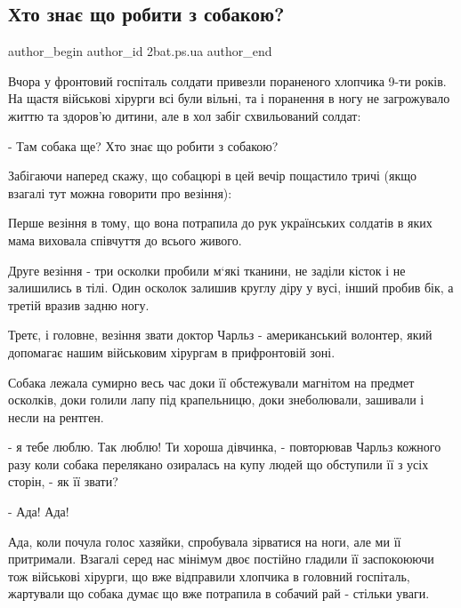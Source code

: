  
 
 
 
 
 
\subsection{Хто знає що робити з собакою?}
\label{sec:04_05_2022.fb.2bat.ps.ua.1.sobaka}
 
\ifcmt
 author_begin
   author_id 2bat.ps.ua
 author_end
\fi

Вчора у фронтовий госпіталь солдати привезли пораненого хлопчика 9-ти років. На
щастя військові хірурги всі були вільні, та і поранення в ногу не загрожувало
життю та здоров’ю дитини, але в хол забіг схвильований солдат:

- Там собака ще? Хто знає що робити з собакою?

Забігаючи наперед скажу, що собацюрі в цей вечір пощастило тричі (якщо взагалі
тут можна говорити про везіння): 

Перше везіння в тому, що вона потрапила до рук українських солдатів  в яких
мама  виховала  співчуття до всього живого. 

Друге везіння - три осколки пробили м‘які тканини, не заділи кісток і не
залишились в тілі. Один осколок залишив круглу діру у вусі, інший пробив бік, а
третій вразив задню ногу. 

Третє, і головне, везіння звати доктор Чарльз - американський волонтер, який
допомагає нашим військовим хірургам в прифронтовій зоні. 

Собака лежала сумирно весь час доки її обстежували магнітом на предмет
осколків, доки голили лапу під крапельницю, доки знеболювали, зашивали і несли
на рентген. 

- я тебе люблю. Так люблю! Ти хороша дівчинка, - повторював Чарльз кожного разу
коли собака перелякано озиралась на купу людей що обступили її з усіх сторін, -
як її звати?

- Ада! Ада!

Ада, коли почула голос хазяйки,  спробувала зірватися на ноги, але ми її
притримали. Взагалі серед нас мінімум двоє постійно гладили її заспокоюючи тож
військові хірурги, що вже відправили хлопчика в головний госпіталь, жартували
що собака думає що вже потрапила в собачий рай - стільки уваги. 

